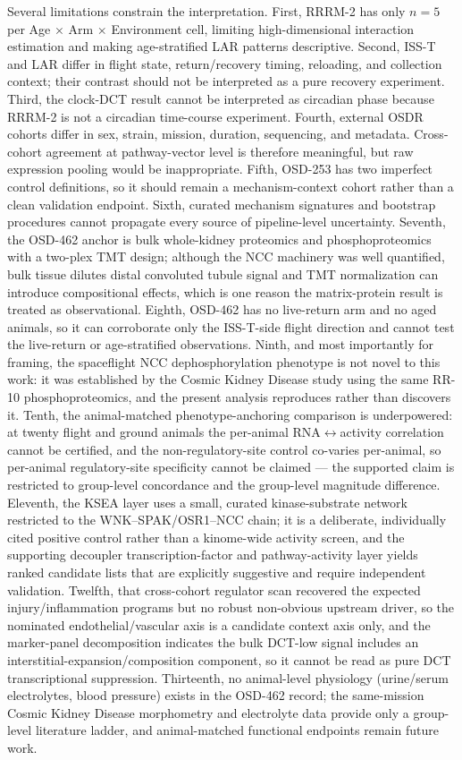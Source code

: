 \documentclass[11pt]{article}
\begin{document}
Several limitations constrain the interpretation. First, RRRM-2 has only $n=5$ per Age $\times$ Arm $\times$ Environment cell, limiting high-dimensional interaction estimation and making age-stratified LAR patterns descriptive. Second, ISS-T and LAR differ in flight state, return/recovery timing, reloading, and collection context; their contrast should not be interpreted as a pure recovery experiment. Third, the clock-DCT result cannot be interpreted as circadian phase because RRRM-2 is not a circadian time-course experiment. Fourth, external OSDR cohorts differ in sex, strain, mission, duration, sequencing, and metadata. Cross-cohort agreement at pathway-vector level is therefore meaningful, but raw expression pooling would be inappropriate. Fifth, OSD-253 has two imperfect control definitions, so it should remain a mechanism-context cohort rather than a clean validation endpoint. Sixth, curated mechanism signatures and bootstrap procedures cannot propagate every source of pipeline-level uncertainty. Seventh, the OSD-462 anchor is bulk whole-kidney proteomics and phosphoproteomics with a two-plex TMT design; although the NCC machinery was well quantified, bulk tissue dilutes distal convoluted tubule signal and TMT normalization can introduce compositional effects, which is one reason the matrix-protein result is treated as observational. Eighth, OSD-462 has no live-return arm and no aged animals, so it can corroborate only the ISS-T-side flight direction and cannot test the live-return or age-stratified observations. Ninth, and most importantly for framing, the spaceflight NCC dephosphorylation phenotype is not novel to this work: it was established by the Cosmic Kidney Disease study using the same RR-10 phosphoproteomics, and the present analysis reproduces rather than discovers it. Tenth, the animal-matched phenotype-anchoring comparison is underpowered: at twenty flight and ground animals the per-animal RNA$\leftrightarrow$activity correlation cannot be certified, and the non-regulatory-site control co-varies per-animal, so per-animal regulatory-site specificity cannot be claimed --- the supported claim is restricted to group-level concordance and the group-level magnitude difference. Eleventh, the KSEA layer uses a small, curated kinase-substrate network restricted to the WNK--SPAK/OSR1--NCC chain; it is a deliberate, individually cited positive control rather than a kinome-wide activity screen, and the supporting decoupler transcription-factor and pathway-activity layer yields ranked candidate lists that are explicitly suggestive and require independent validation. Twelfth, that cross-cohort regulator scan recovered the expected injury/inflammation programs but no robust non-obvious upstream driver, so the nominated endothelial/vascular axis is a candidate context axis only, and the marker-panel decomposition indicates the bulk DCT-low signal includes an interstitial-expansion/composition component, so it cannot be read as pure DCT transcriptional suppression. Thirteenth, no animal-level physiology (urine/serum electrolytes, blood pressure) exists in the OSD-462 record; the same-mission Cosmic Kidney Disease morphometry and electrolyte data provide only a group-level literature ladder, and animal-matched functional endpoints remain future work.
\end{document}
